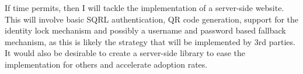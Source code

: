 If time permits, then I will tackle the implementation of a server-side website. This will involve basic SQRL authentication, QR code generation, support for the identity lock mechanism and possibly a username and password based fallback mechanism, as this is likely the strategy that will be implemented by 3rd parties. It would also be desirable to create a server-side library to ease the implementation for others and accelerate adoption rates.
